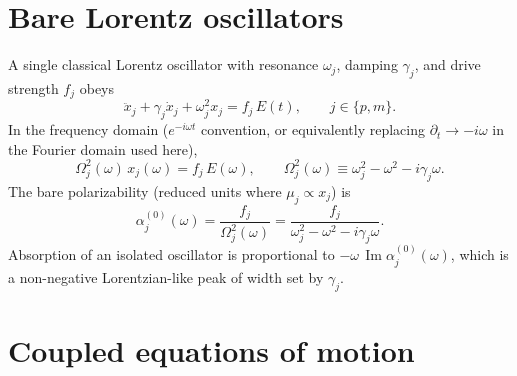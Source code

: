 \documentclass[11pt,a4paper]{article}
\begin{document}
\section{Bare Lorentz oscillators}

A single classical Lorentz oscillator with resonance $\omega_j$, damping
$\gamma_j$, and drive strength $f_j$ obeys
\begin{equation}
  \ddot x_j + \gamma_j \dot x_j + \omega_j^2 x_j
  =
  f_j\, E(t),
  \qquad
  j\in\{p,m\}.
  \label{eq:bare-eom}
\end{equation}
In the frequency domain ($e^{-i\omega t}$ convention, or equivalently
replacing $\partial_t\to -i\omega$ in the Fourier domain used here),
\begin{equation}
  \Omega_j^2(\omega)\, x_j(\omega)
  =
  f_j\, E(\omega),
  \qquad
  \Omega_j^2(\omega)
  \equiv
  \omega_j^2 - \omega^2 - i\gamma_j\omega.
  \label{eq:Omega}
\end{equation}
The bare polarizability (reduced units where $\mu_j \propto x_j$) is
\begin{equation}
  \alpha_j^{(0)}(\omega)
  =
  \frac{f_j}{\Omega_j^2(\omega)}
  =
  \frac{f_j}{\omega_j^2 - \omega^2 - i\gamma_j\omega}.
  \label{eq:alpha0}
\end{equation}
Absorption of an isolated oscillator is proportional to
$-\omega\,\operatorname{Im}\alpha_j^{(0)}(\omega)$, which is a
non-negative Lorentzian-like peak of width set by $\gamma_j$.

\section{Coupled equations of motion}
\end{document}
